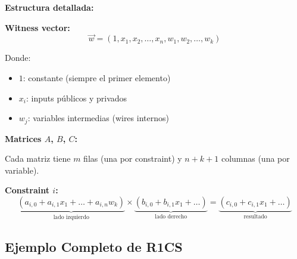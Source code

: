 \documentclass[11pt,a4paper,twoside,openright]{book}
\theoremstyle{definition}
\theoremstyle{plain}
\theoremstyle{remark}
\begin{document}
\begin{mathnote}
\textbf{Estructura detallada:}

\textbf{Witness vector:}
\[ \vec{w} = (1, x_1, x_2, \ldots, x_n, w_1, w_2, \ldots, w_k) \]

Donde:
\begin{itemize}
    \item $1$: constante (siempre el primer elemento)
    \item $x_i$: inputs públicos y privados
    \item $w_j$: variables intermedias (wires internos)
\end{itemize}

\textbf{Matrices $A$, $B$, $C$:}

Cada matriz tiene $m$ filas (una por constraint) y $n+k+1$ columnas (una por variable).

\textbf{Constraint $i$:}
\[ \underbrace{(a_{i,0} + a_{i,1}x_1 + \ldots + a_{i,n}w_k)}_{\text{lado izquierdo}} \times \underbrace{(b_{i,0} + b_{i,1}x_1 + \ldots)}_{\text{lado derecho}} = \underbrace{(c_{i,0} + c_{i,1}x_1 + \ldots)}_{\text{resultado}} \]
\end{mathnote}

\subsection{Ejemplo Completo de R1CS}
\end{document}
